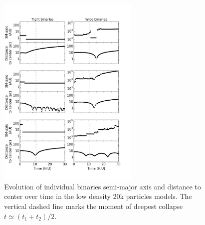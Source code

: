  

%  
 
	
\begin{figure}
\includegraphics[width=0.6\textwidth]{Figures/6_adventures}
\caption{ Evolution of individual binaries semi-major axis and distance to center over time in the low density 20k particles models. The vertical dashed line marks the moment of deepest collapse $t \simeq (t_1 + t_2) / 2$. }
\label{Fig:6_adventures}
\end{figure}



